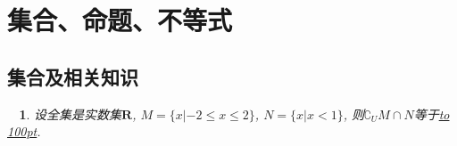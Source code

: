 \documentclass[a4paper,11pt]{book}
\newtheorem{ex}{~}
\newcommand{\blank}[1]{\underline{\hbox to #1pt{}}}
\begin{document}
	\section{集合、命题、不等式}
	
	\subsection{集合及相关知识}
	
	\begin{ex}
		设全集是实数集$\mathbf{R}$, $M=\{x|-2\le x\le 2\}$, $N=\{x|x<1\}$, 则$\complement_UM\cap N$等于\blank{100}.
	\end{ex}
	
\end{document}
